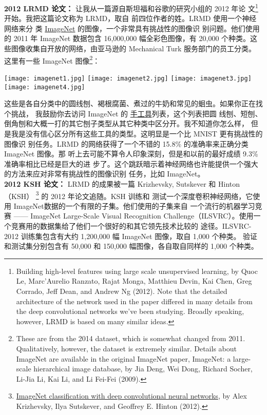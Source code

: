 \textbf{2012 LRMD 论文：} 让我从一篇源自斯坦福和谷歌的研究小组的 2012 年论
文\footnote{Building high-level features using large scale unsupervised
  learning, by Quoc Le, Marc'Aurelio Ranzato, Rajat Monga, Matthieu Devin, Kai
  Chen, Greg Corrado, Jeff Dean, and Andrew Ng (2012). Note that the detailed
  architecture of the network used in the paper differed in many details from
  the deep convolutional networks we've been studying. Broadly speaking,
  however, LRMD is based on many similar ideas.}开始。我把这篇论文称为 LRMD，取自
前四位作者的姓。LRMD 使用一个神经网络来分
类 \href{http://www.image-net.org/}{ImageNet} 的图像，一个非常具有挑战性的图像识
别问题。他们使用的 2011 年 ImageNet 数据包含 16,000,000 幅全彩色图像，有 20,000
个种类。这些图像收集自开放的网络，由亚马逊的 Mechanical Turk 服务部门的员工分类。
这里有一些 ImageNet 图像\footnote{These are from the 2014 dataset, which is
  somewhat changed from 2011. Qualitatively, however, the dataset is extremely
  similar. Details about ImageNet are available in the original ImageNet paper,
  ImageNet: a large-scale hierarchical image database, by Jia Deng, Wei Dong,
  Richard Socher, Li-Jia Li, Kai Li, and Li Fei-Fei (2009).}：

\begin{center}
	\texttt{[image: imagenet1.jpg]}%
	\texttt{[image: imagenet2.jpg]}%
	\texttt{[image: imagenet3.jpg]}%
	\texttt{[image: imagenet4.jpg]}
\end{center}

这些是各自分类中的圆线刨、褐根腐菌、煮过的牛奶和常见的蛔虫。如果你正在找个挑战，
我鼓励你去访问 ImageNet 的%
\href{http://www.image-net.org/synset?wnid=n03489162}{手工具}列表，这个列表把圆
线刨、短刨、倒角刨和大概一打的其它刨子类型从其它种类中区分开。我不知道你怎么样，
但是我是没有信心区分所有这些工具的类型。这明显是一个比 MNIST 更有挑战性的图像识
别任务。LRMD 的网络获得了一个不错的 15.8\% 的准确率来正确分类 ImageNet 图像。那
听上去可能不算令人印象深刻，但是和以前的最好成绩 9.3\% 准确率相比已经是巨大的进
步了。这个跳跃暗示着神经网络也许能提供一个强大的方法来应对非常有挑战性的图像识别
任务，比如 ImageNet。\\

\textbf{2012 KSH 论文：} LRMD 的成果被一篇 Krizhevsky,
Sutskever 和 Hinton （KSH）
\footnote{\href{http://www.cs.toronto.edu/~fritz/absps/imagenet.pdf}{ImageNet
    classification with deep convolutional neural networks}, by Alex Krizhevsky,
  Ilya Sutskever, and Geoffrey E. Hinton (2012).} 的 2012 年论文追随。KSH 训练和
测试一个深度卷积神经网络，它使用 ImageNet数据的一个有限的子集。他们使用的子集来自
一个流行的机器学习竞赛 —— ImageNet Large-Scale Visual Recognition
Challenge（ILSVRC）。使用一个竞赛用的数据集给了他们一个很好的和其它领先技术比较的
途径。ILSVRC-2012 训练集包含有大约 1,200,000 幅 ImageNet 图像，取自 1,000 个种类。
验证和测试集分别包含有 50,000 和 150,000 幅图像，各自取自同样的 1,000 个种类。

